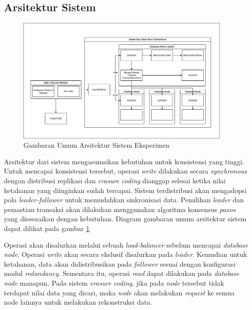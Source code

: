 \subsection{Arsitektur Sistem}
\label{subsection:system-architecture}

\begin{figure}[ht]
    \centering
    \includegraphics[width=0.95\textwidth]{resources/chapter-3/general-architecture.png}
    \caption{Gambaran Umum Arsitektur Sistem Eksperimen}
    \label{fig:general-architecture}
\end{figure}

Arsitektur dari sistem mengasumsikan kebutuhan untuk konsistensi yang tinggi. Untuk mencapai konsistensi tersebut, operasi \textit{write} dilakukan secara \textit{synchronous} dengan distribusi replikasi dan \textit{erasure coding} dianggap selesai ketika nilai ketahanan yang diinginkan sudah tercapai. Sistem terdistribusi akan mengadopsi pola \textit{leader-follower} untuk memudahkan sinkronisasi data. Pemilihan \textit{leader} dan pemastian transaksi akan dilakukan menggunakan algoritma konsensus \textit{paxos} yang disesuaikan dengan kebutuhan. Diagram gambaran umum arsitektur sistem dapat dilihat pada gambar \ref{fig:general-architecture}.

Operasi akan disalurkan melalui sebuah \textit{load-balancer} sebelum mencapai \textit{database node}. Operasi \textit{write} akan secara ekslusif disalurkan pada \textit{leader}. Kemudian untuk ketahanan, data akan didistribusikan pada \textit{follower} sesuai dengan konfigurasi modul \textit{redundancy}. Sementara itu, operasi \textit{read} dapat dilakukan pada \textit{database node} manapun. Pada sistem \textit{erasure coding}, jika pada \textit{node} tersebut tidak terdapat nilai data yang dicari, maka \textit{node} akan melakukan \textit{request} ke semua node lainnya untuk melakukan rekonstruksi data.

